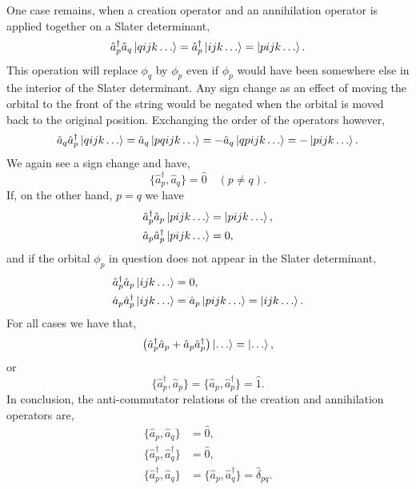     One case remains, when a creation operator and an annihilation operator is
    applied together on a Slater determinant,
    \begin{equation}
        \hat{a}_p^\dagger \hat{a}_q \ket{qijk \dots} 
            = \hat{a}_p^\dagger \ket{ijk \dots}
            = \ket{pijk \dots}.
    \end{equation}
    This operation will replace $\phi_q$ by $\phi_p$ even if $\phi_p$ would have
    been somewhere else in the interior of the Slater determinant. Any sign change
    as an effect of moving the orbital to the front of the string would be negated
    when the orbital is moved back to the original position. Exchanging the order
    of the operators however,
    \begin{equation}
        \hat{a}_q \hat{a}_p^\dagger \ket{qijk \dots} 
            = \hat{a}_q \ket{pqijk \dots} 
            = -\hat{a}_q \ket{qpijk \dots}
            = -\ket{pijk \dots}.
    \end{equation}
    We again see a sign change and have,
    \begin{equation}
        \{\hat{a}_p^\dagger, \hat{a}_q\} = \hat{0} \quad (p \neq q).
    \end{equation}
    If, on the other hand, $p=q$ we have 
    \begin{equation}
        \begin{aligned}
            \hat{a}_p^\dagger \hat{a}_p \ket{pijk \dots} &= \ket{pijk \dots}, \\
            \hat{a}_p \hat{a}_p^\dagger \ket{pijk \dots} &= 0,
        \end{aligned}
    \end{equation}
    and if the orbital $\phi_p$ in question does not appear in the Slater 
    determinant,
    \begin{equation}
        \begin{aligned}
            \hat{a}_p^\dagger \hat{a}_p \ket{ijk \dots} &= 0, \\
            \hat{a}_p \hat{a}_p^\dagger \ket{ijk \dots} &= 
                \hat{a}_p\ket{pijk \dots} = \ket{ijk \dots}.           
        \end{aligned}
    \end{equation} 
    For all cases we have that,
    \begin{equation}
        \left(\hat{a}_p^\dagger \hat{a}_p + \hat{a}_p \hat{a}_p^\dagger \right)
        \ket{\dots} = \ket{\dots},
    \end{equation}
    or
    \begin{equation}
        \{\hat{a}_p^\dagger, \hat{a}_p\} = \{\hat{a}_p, \hat{a}_p^\dagger\} = \hat{1}.
    \end{equation}
    In conclusion, the anti-commutator relations of the creation and annihilation
    operators are,
    \begin{align}
        \{\hat{a}_p, \hat{a}_q\} &= \hat{0}, \\
        \{\hat{a}_p^\dagger, \hat{a}_q^\dagger\} &= \hat{0}, \\
        \{\hat{a}_p^\dagger, \hat{a}_q\} &= \{\hat{a}_p, \hat{a}_q^\dagger\} 
         = \hat{\delta}_{pq}.
    \end{align}
